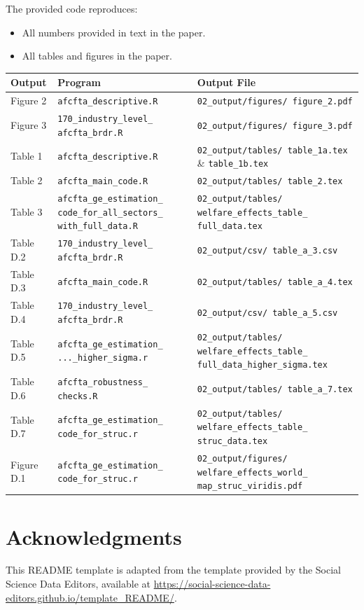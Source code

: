 \documentclass[12pt]{article}
\begin{document}
The provided code reproduces:

\begin{itemize}
	\item[\rlap{\raisebox{0.3ex}{\hspace{0.4ex}\tiny \ding{52}}}$\square$] All numbers provided in text in the paper.
	\item[\rlap{\raisebox{0.3ex}{\hspace{0.4ex}\tiny \ding{52}}}$\square$] All tables and figures in the paper.
\end{itemize}

\small
\begin{longtable}{p{}p{}p{}}
	\toprule
	Output & Program & Output File \\
	\midrule
	\endhead
	Figure 2 & \texttt{afcfta\_descriptive.R} & \texttt{02\_output/figures/ figure\_2.pdf} \\
	Figure 3 & \texttt{170\_industry\_level\_ afcfta\_brdr.R} & \texttt{02\_output/figures/ figure\_3.pdf} \\
	Table 1 & \texttt{afcfta\_descriptive.R} & \texttt{02\_output/tables/ table\_1a.tex} \& \texttt{table\_1b.tex} \\
	Table 2 & \texttt{afcfta\_main\_code.R} & \texttt{02\_output/tables/ table\_2.tex} \\
	Table 3 & \texttt{afcfta\_ge\_estimation\_ code\_for\_all\_sectors\_ with\_full\_data.R} & \texttt{02\_output/tables/ welfare\_effects\_table\_ full\_data.tex} \\
	Table D.2 & \texttt{170\_industry\_level\_ afcfta\_brdr.R} & \texttt{02\_output/csv/ table\_a\_3.csv} \\
	Table D.3 & \texttt{afcfta\_main\_code.R} & \texttt{02\_output/tables/ table\_a\_4.tex} \\
	Table D.4 & \texttt{170\_industry\_level\_ afcfta\_brdr.R} & \texttt{02\_output/csv/ table\_a\_5.csv} \\
	Table D.5 & \texttt{afcfta\_ge\_estimation\_ ...\_higher\_sigma.r} & \texttt{02\_output/tables/ welfare\_effects\_table\_ full\_data\_higher\_sigma.tex} \\
	Table D.6 & \texttt{afcfta\_robustness\_ checks.R} & \texttt{02\_output/tables/ table\_a\_7.tex} \\
	Table D.7 & \texttt{afcfta\_ge\_estimation\_ code\_for\_struc.r} & \texttt{02\_output/tables/ welfare\_effects\_table\_ struc\_data.tex} \\
	Figure D.1 & \texttt{afcfta\_ge\_estimation\_ code\_for\_struc.r} & \texttt{02\_output/figures/ welfare\_effects\_world\_ map\_struc\_viridis.pdf} \\
	\bottomrule
\end{longtable}
\normalsize

\section*{Acknowledgments}

This README template is adapted from the template provided by the Social Science Data Editors, available at \url{https://social-science-data-editors.github.io/template_README/}.
\end{document}
